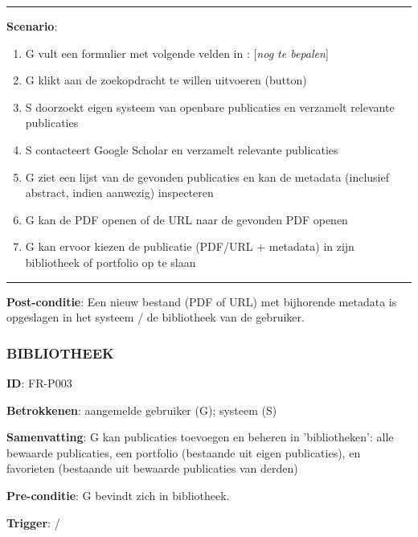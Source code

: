 \hrule
\vspace{2 mm}
\noindent \textbf{Scenario}:
\begin{enumerate}
\item G vult een formulier met volgende velden in :  [{\it nog te bepalen}]
\item G klikt aan de zoekopdracht te willen uitvoeren (button)
\item S doorzoekt eigen systeem van openbare publicaties en verzamelt relevante publicaties
\item S contacteert Google Scholar en verzamelt relevante publicaties
\item G ziet een lijst van de gevonden publicaties en kan de metadata (inclusief abstract, indien aanwezig) inspecteren
\item G kan de PDF openen of de URL naar de gevonden PDF openen 
\item G kan ervoor kiezen de publicatie (PDF/URL + metadata) in zijn bibliotheek of portfolio op te slaan
\end{enumerate}

\vspace{2 mm}
\hrule
\vspace{4 mm}


\noindent \textbf{Post-conditie}: Een nieuw bestand (PDF of URL) met bijhorende metadata is opgeslagen in het systeem / de bibliotheek van de gebruiker. \\


\subsubsection{BIBLIOTHEEK}
\vspace{2 mm}

\textbf{ID}: FR-P003
\vspace{2 mm}

\noindent \textbf{Betrokkenen}: aangemelde gebruiker (G); systeem (S) 
\vspace{2 mm}

\noindent \textbf{Samenvatting}: G kan publicaties toevoegen en beheren in 'bibliotheken': alle bewaarde publicaties, een portfolio (bestaande uit eigen publicaties), en favorieten (bestaande uit bewaarde publicaties van derden)
\vspace{2 mm}

\noindent \textbf{Pre-conditie}: G bevindt zich in bibliotheek. 
\vspace{2 mm}

\noindent \textbf{Trigger}: / 
\vspace{4 mm}

